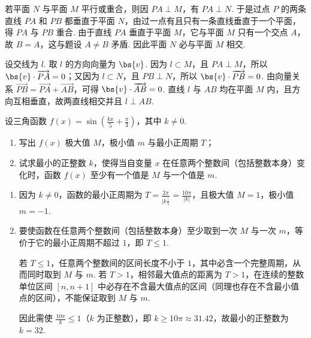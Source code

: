 \documentclass[UTF8,a4paper,oneside,11pt]{ctexbook}
\begin{document}
\begin{solution}
若平面 \(N\) 与平面 \(M\) 平行或重合，则因 \(PA\perp M\)，有 \(PA\perp N\). 于是过点 \(P\) 的两条直线 \(PA\) 和 \(PB\) 都垂直于平面 \(N\)，由过一点有且只有一条直线垂直于一个平面，得 \(PA\) 与 \(PB\) 重合. 由于直线 \(PA\) 垂直于平面 \(M\)，它与平面 \(M\) 只有一个交点 \(A\)，故 \(B=A\)，这与题设 \(A\neq B\) 矛盾. 因此平面 \(N\) 必与平面 \(M\) 相交.

设交线为 \(l\). 取 \(l\) 的方向向量为 \(\bs{v}\). 因为 \(l\subset M\)，且 \(PA\perp M\)，所以 \(\bs{v}\cdot\overrightarrow{PA}=0\)；又因为 \(l\subset N\)，且 \(PB\perp N\)，所以 \(\bs{v}\cdot\overrightarrow{PB}=0\). 由向量关系 \(\overrightarrow{PB}=\overrightarrow{PA}+\overrightarrow{AB}\)，可得 \(\bs{v}\cdot\overrightarrow{AB}=0\). 直线 \(l\) 与 \(AB\) 均在平面 \(M\) 内，且方向互相垂直，故两直线相交并且 \(l\perp AB\).
\end{solution}

\begin{problem}
设三角函数 \(f(x)=\sin\left(\frac{kx}{5}+\frac{\pi}{3}\right)\)，其中 \(k\neq0\).

\begin{enumerate}
\item 写出 \(f(x)\) 极大值 \(M\)，极小值 \(m\) 与最小正周期 \(T\)；
\item 试求最小的正整数 \(k\)，使得当自变量 \(x\) 在任意两个整数间（包括整数本身）变化时，函数 \(f(x)\) 至少有一个值是 \(M\) 与一个值是 \(m\).
\end{enumerate}
\end{problem}

\begin{solution}
\begin{enumerate}
\item 因为 \(k\neq0\)，函数的最小正周期为 \(T=\frac{2\pi}{\lvert k\frac{\rvert}{5}}=\frac{10\pi}{\lvert k\rvert}\)，且极大值 \(M=1\)，极小值 \(m=-1\).
\item 要使函数在任意两个整数间（包括整数本身）至少取到一次 \(M\) 与一次 \(m\)，等价于它的最小正周期不超过 \(1\)，即 \(T\leqslant1\).

若 \(T\leqslant1\)，任意两个整数间的区间长度不小于 \(1\)，其中必含一个完整周期，从而同时取到 \(M\) 与 \(m\). 若 \(T>1\)，相邻最大值点的距离为 \(T>1\)，在连续的整数单位区间 \([n,n+1]\) 中必存在不含最大值点的区间（同理也存在不含最小值点的区间），不能保证取到 \(M\) 与 \(m\).

因此需使 \(\frac{10\pi}{k}\leqslant1\)（\(k\) 为正整数），即 \(k\geqslant10\pi\approx31.42\)，故最小的正整数为 \(k=32\).
\end{enumerate}
\end{solution}
\end{document}
